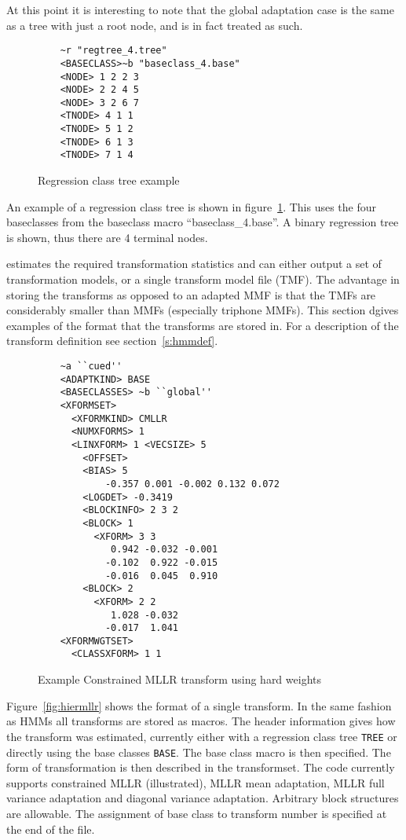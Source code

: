 At this point it is interesting to note that the global adaptation
case is the same as a tree with just a root node, and is in fact
treated as such.

\begin{center}
\begin{figure}
\begin{verbatim}
    ~r "regtree_4.tree"
    <BASECLASS>~b "baseclass_4.base"
    <NODE> 1 2 2 3 
    <NODE> 2 2 4 5 
    <NODE> 3 2 6 7 
    <TNODE> 4 1 1
    <TNODE> 5 1 2
    <TNODE> 6 1 3
    <TNODE> 7 1 4
\end{verbatim}
\caption{Regression class tree example}
\label{fig:regtree}
\end{figure}
\end{center}
An example of a regression class tree is shown in figure~\ref{fig:regtree}.
This uses the four baseclasses from the baseclass macro ``baseclass\_4.base''.
A binary regression tree is shown, thus there are 4 terminal nodes. 


 estimates the required transformation statistics and can
either output a set of transformation models, or a single transform
model file (TMF). The advantage
in storing the transforms as opposed to an adapted MMF is that the
TMFs are considerably smaller than MMFs (especially triphone
MMFs). This section dgives examples of the format that the transforms
are stored in. For a description of the transform definition see
section~\ref{s:hmmdef}.

\noindent

\begin{figure}[htbp]
\begin{verbatim}
    ~a ``cued''
    <ADAPTKIND> BASE
    <BASECLASSES> ~b ``global''
    <XFORMSET>  
      <XFORMKIND> CMLLR
      <NUMXFORMS> 1
      <LINXFORM> 1 <VECSIZE> 5
        <OFFSET> 
        <BIAS> 5
            -0.357 0.001 -0.002 0.132 0.072
        <LOGDET> -0.3419
        <BLOCKINFO> 2 3 2
        <BLOCK> 1
          <XFORM> 3 3
             0.942 -0.032 -0.001
            -0.102  0.922 -0.015
            -0.016  0.045  0.910
        <BLOCK> 2
          <XFORM> 2 2
             1.028 -0.032
            -0.017  1.041 
    <XFORMWGTSET>
      <CLASSXFORM> 1 1
\end{verbatim}
\caption{Example Constrained MLLR transform using hard weights}
\end{figure}
Figure~\ref{fig:hiermllr} shows the format of a single transform. In
the same fashion as HMMs all transforms are stored as macros. The
header information gives how the transform was estimated, currently
either with a regression class tree {\tt TREE} or directly using the
base classes {\tt BASE}. The base class macro is then specified. The
form of transformation is then described in the transformset. The code
currently supports constrained MLLR (illustrated), MLLR mean
adaptation, MLLR full variance adaptation and diagonal variance
adaptation.  Arbitrary block structures are allowable.  The assignment
of base class to transform number is specified at the end of the file.

